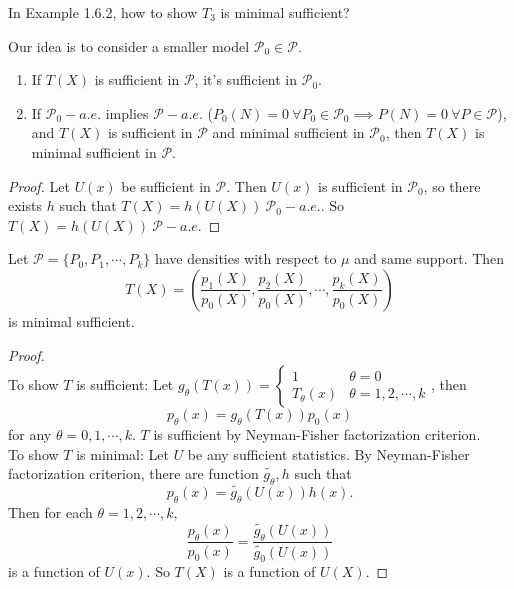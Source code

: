 \documentclass[a4paper]{article}
\begin{document}
\begin{question}
	In Example 1.6.2, how to show $T_3$ is minimal sufficient?
\end{question}

\begin{answer}
	Our idea is to consider a smaller model $\mathcal{P}_0 \in \mathcal{P}$.
	\begin{enumerate}
		\item If $T(X)$ is sufficient in $\mathcal{P}$, it's sufficient in $\mathcal{P}_0$.
		\item If $\mathcal{P}_0 - a.e.$ implies $\mathcal{P} - a.e.$ ($P_0(N)=0 \ \forall P_0 \in \mathcal{P}_0 \implies P(N)=0 \ \forall P \in \mathcal{P}$), and $T(X)$ is sufficient in $\mathcal{P}$ and minimal sufficient in $\mathcal{P}_0$, then $T(X)$ is minimal sufficient in $\mathcal{P}$.
	\end{enumerate}
\end{answer}
\begin{proof}
	Let $U(x)$ be sufficient in $\mathcal{P}$. Then $U(x)$ is sufficient in $\mathcal{P}_0$, so there exists $h$ such that $T(X)=h(U(X)) \ \mathcal{P}_0 - a.e.$. So $T(X) = h(U(X)) \ \mathcal{P} - a.e.$
\end{proof}

\begin{thm}
	Let $\mathcal{P}=\{P_0,P_1,\cdots,P_k\}$ have densities with respect to $\mu$ and same support. Then
	\begin{equation}
		T(X) = \left(\frac{p_1(X)}{p_0(X)},\frac{p_2(X)}{p_0(X)},\cdots,\frac{p_k(X)}{p_0(X)}\right)
	\end{equation}
	is minimal sufficient.
\end{thm}

\begin{proof}
	\quad \\
	To show $T$ is sufficient: Let $g_\theta(T(x)) =\left\{ 
	\begin{array}{ll}
		1 &\theta = 0 \\
		T_\theta (x) & \theta = 1,2,\cdots,k
	\end{array} \right.$, then
	\begin{equation}
		p_\theta (x) = g_\theta (T(x))p_0(x)
	\end{equation}
	for any $\theta = 0,1,\cdots, k$. $T$ is sufficient by Neyman-Fisher factorization criterion. \\
	To show $T$ is minimal: Let $U$ be any sufficient statistics. By Neyman-Fisher factorization criterion, there are function $\tilde{g_\theta},h$ such that
	\begin{equation}
		p_\theta(x)=\tilde{g_\theta}(U(x))h(x).
	\end{equation}
	Then for each $\theta = 1,2,\cdots,k,$ 
	\begin{equation}
		\frac{p_\theta(x)}{p_0(x)} = \frac{\tilde{g_\theta}(U(x))}{\tilde{g_0}(U(x))}
	\end{equation}
	is a function of $U(x)$. So $T(X)$ is a function of $U(X)$.
\end{proof}
\end{document}
